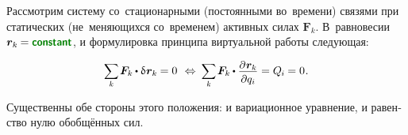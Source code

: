

\label{para:statics}

\begin{otherlanguage}{russian}

Рассмотрим систему со~стационарными (постоянными во~времени) связями при статических (не~меняющихся со~временем) активных силах ${\bm{F}_k}$.
В~равновесии ${\locationvector_k \hspace{-0.12ex} = \boldconstant}$, и формулировка принципа виртуальной работы следующая:

\nopagebreak\vspace{-0.1em}\begin{equation}\label{statics.discrete:principleofvirtualwork}
\scalebox{0.92}[0.96]{$ \displaystyle \sum_{\smash{k}} $} \hspace{.25ex}
\bm{F}_k \hspace{-0.1ex} \dotp \variation{\hspace{.1ex}\locationvector_k} \hspace{-0.1ex} = 0
\:\,\Leftrightarrow\:
\scalebox{0.92}[0.96]{$ \displaystyle \sum_{\smash{k}} $} \hspace{.25ex}
\bm{F}_k \hspace{-0.1ex} \dotp \scalebox{0.96}{$ \displaystyle \frac{\raisemath{-0.12em}{\partial \hspace{.1ex} \locationvector_k}}{\raisemath{-0.1em}{\partial q_i}} $}
= Q_{\hspace{-0.1ex}i} \hspace{-0.1ex} = 0 \hspace{.1ex} .
\vspace{-0.1em}\end{equation}

\vspace{-0.15em}\noindent
Существенны обе стороны этого положения: и вариационное уравнение, и равенство нулю обобщённых сил.


\end{otherlanguage}
